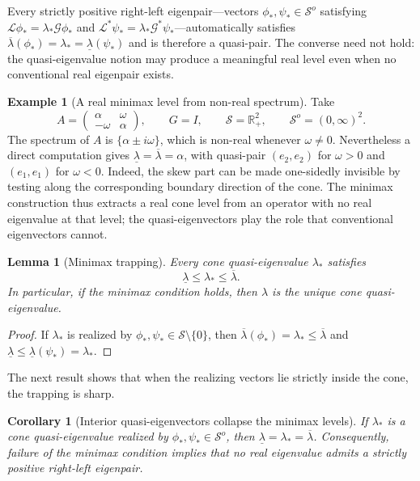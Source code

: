 \documentclass[preprint,10pt]{elsarticle}
\theoremstyle{plain}
\newtheorem{corollary}{Corollary}
\newtheorem{lemma}{Lemma}
\theoremstyle{definition}
\newtheorem{example}{Example}
\theoremstyle{remark}
\begin{document}
Every strictly positive right-left eigenpair---vectors
$\phi_{*},\psi_{*}\in\mathcal{S}^{o}$ satisfying
$\mathcal{L}\phi_{*}=\lambda_{*}\mathcal{G}\phi_{*}$ and
$\mathcal{L}^{*}\psi_{*}=\lambda_{*}\mathcal{G}^{*}\psi_{*}$---automatically
satisfies $\overline{\lambda}(\phi_{*})=\lambda_{*}=\underline{\lambda}(\psi_{*})$
and is therefore a quasi-pair. The converse need not hold: the quasi-eigenvalue
notion may produce a meaningful real level even when no conventional real
eigenpair exists.

\medskip

\begin{example}[A real minimax level from non-real spectrum]
	Take
	\[
	A = \begin{pmatrix}\alpha & \omega \\ -\omega & \alpha\end{pmatrix},
	\qquad G = I,
	\qquad \mathcal{S} = \mathbb{R}_{+}^{2},
	\qquad \mathcal{S}^{o} = (0,\infty)^{2}.
	\]
	The spectrum of $A$ is $\{\alpha\pm i\omega\}$, which is non-real whenever
	$\omega\ne0$. Nevertheless a direct computation gives
	$\underline{\lambda}=\overline{\lambda}=\alpha$, with quasi-pair $(e_{2},e_{2})$
	for $\omega>0$ and $(e_{1},e_{1})$ for $\omega<0$. Indeed, the skew part can
	be made one-sidedly invisible by testing along the corresponding boundary
	direction of the cone. The minimax construction thus extracts a real cone
	level from an operator with no real eigenvalue at that level; the
	quasi-eigenvectors play the role that conventional eigenvectors cannot.
\end{example}

\begin{lemma}[Minimax trapping]\label{lem:main}
	Every cone quasi-eigenvalue $\lambda_{*}$ satisfies
	\[
	\underline{\lambda} \leq \lambda_{*} \leq \overline{\lambda}.
	\]
	In particular, if the minimax condition holds, then $\hat\lambda$ is the
	unique cone quasi-eigenvalue.
\end{lemma}

\begin{proof}
	If $\lambda_{*}$ is realized by $\phi_{*},\psi_{*}\in\mathcal{S}\setminus\{0\}$,
	then $\overline{\lambda}(\phi_{*})=\lambda_{*}\leq\overline{\lambda}$ and
	$\underline{\lambda}\leq\underline{\lambda}(\psi_{*})=\lambda_{*}$.
\end{proof}

The next result shows that when the realizing vectors lie strictly inside the
cone, the trapping is sharp.

\begin{corollary}[Interior quasi-eigenvectors collapse the minimax levels]
	\label{cor:interior-eigenvalue-collapse}
	If $\lambda_{*}$ is a cone quasi-eigenvalue realized by
	$\phi_{*},\psi_{*}\in\mathcal{S}^{o}$, then
	$\underline{\lambda}=\lambda_{*}=\overline{\lambda}$.
	Consequently, failure of the minimax condition implies that no real eigenvalue
	admits a strictly positive right-left eigenpair.
\end{corollary}
\end{document}
